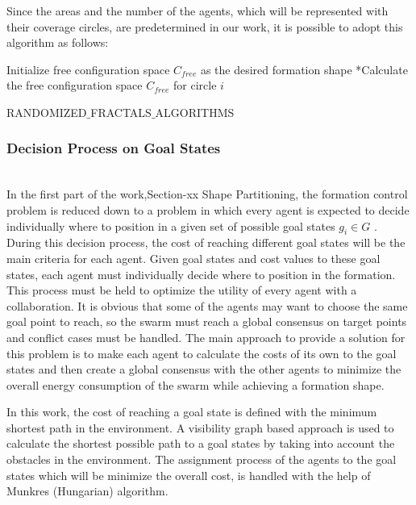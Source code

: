Since the areas and the number of the agents, which will be represented with their coverage circles, are predetermined in our work, it is possible to adopt this algorithm as follows:
		
\begin{algorithm}[H]
Initialize free configuration space $C_{free}$ as the desired formation shape
{		
*Calculate the free configuration space $C_{free}$ for circle $i$\;
}												
\caption{RANDOMIZED$\_$FRACTALS$\_$ALGORITHMS}
\end{algorithm}
		

	
\subsubsection{Decision Process on Goal States}\hspace{0pt} \\
In the first part of the work,Section-xx Shape Partitioning, the formation control problem is reduced down to a problem in which every agent is expected to decide individually where to position in a given set of possible goal states $g_i \in G$ .  During this decision process, the cost of reaching different goal states will be the main criteria for each agent. Given goal states and cost values to these goal states, each agent must individually  decide where to position in the formation. This process must be held to optimize the utility of every agent with a collaboration. It is obvious that some of the agents may want to choose the same goal point to reach, so the swarm must reach a global consensus on target points and conflict cases must be handled. The main approach to provide a solution for this problem is to make each agent to calculate the costs of its own to the goal states and then create a global consensus with the other agents to minimize the overall energy consumption of the swarm while achieving a formation shape. 

In this work, the cost of reaching a goal state is defined with the minimum shortest path in the environment. A visibility graph based approach is used to calculate the shortest possible path to a goal states by taking into account the obstacles in the environment. The assignment process of the agents to the goal states which will be minimize the overall cost, is handled with the help of Munkres (Hungarian)  algorithm.
	
